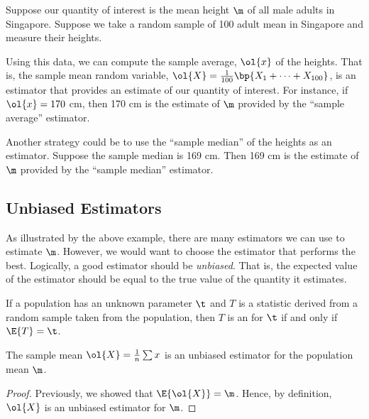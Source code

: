 \begin{example}
    Suppose our quantity of interest is the mean height $\m$ of all male adults in Singapore. Suppose we take a random sample of 100 adult mean in Singapore and measure their heights.
    
    Using this data, we can compute the sample average, $\ol{x}$ of the heights. That is, the sample mean random variable, $\ol{X} = \frac1{100} \bp{X_1 + \dots + X_{100}}$, is an estimator that provides an estimate of our quantity of interest. For instance, if $\ol{x} = 170$ cm, then 170 cm is the estimate of $\m$ provided by the ``sample average'' estimator.

    Another strategy could be to use the ``sample median'' of the heights as an estimator. Suppose the sample median is 169 cm. Then 169 cm is the estimate of $\m$ provided by the ``sample median'' estimator.
\end{example}

\subsection{Unbiased Estimators}

As illustrated by the above example, there are many estimators we can use to estimate $\m$. However, we would want to choose the estimator that performs the best. Logically, a good estimator should be \emph{unbiased}. That is, the expected value of the estimator should be equal to the true value of the quantity it estimates. 

\begin{definition}
    If a population has an unknown parameter $\t$ and $T$ is a statistic derived from a random sample taken from the population, then $T$ is an  for $\t$ if and only if $\E{T} = \t$.
\end{definition}

\begin{proposition}
    The sample mean $\ol{X} = \frac1n \sum x$ is an unbiased estimator for the population mean $\m$.
\end{proposition}
\begin{proof}
    Previously, we showed that $\E{\ol{X}} = \m$. Hence, by definition, $\ol{X}$ is an unbiased estimator for $\m$.
\end{proof}

